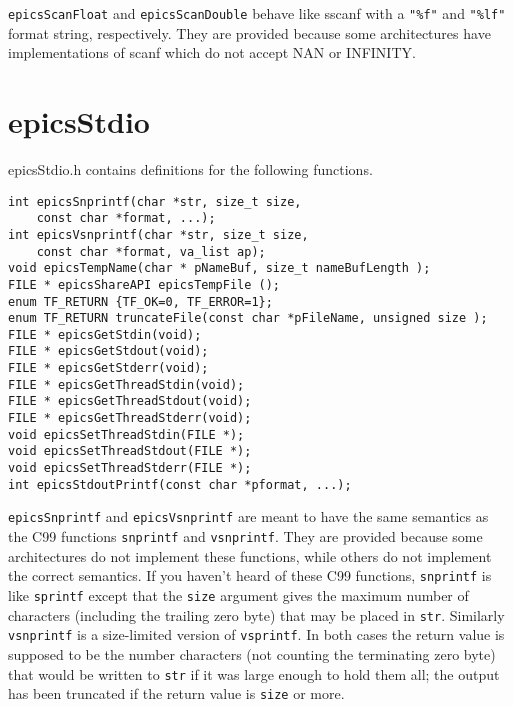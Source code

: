 \verb|epicsScanFloat| and \verb|epicsScanDouble| behave like sscanf with a \verb|"%f"| and \verb|"%lf"| format string, respectively.  
They are provided because some architectures have implementations of scanf which do not accept NAN or INFINITY.



\section{epicsStdio}

epicsStdio.h contains definitions for the following functions.

\begin{verbatim}int epicsSnprintf(char *str, size_t size,
    const char *format, ...);
int epicsVsnprintf(char *str, size_t size,
    const char *format, va_list ap);
void epicsTempName(char * pNameBuf, size_t nameBufLength );
FILE * epicsShareAPI epicsTempFile ();
enum TF_RETURN {TF_OK=0, TF_ERROR=1};
enum TF_RETURN truncateFile(const char *pFileName, unsigned size );
FILE * epicsGetStdin(void);
FILE * epicsGetStdout(void);
FILE * epicsGetStderr(void);
FILE * epicsGetThreadStdin(void);
FILE * epicsGetThreadStdout(void);
FILE * epicsGetThreadStderr(void);
void epicsSetThreadStdin(FILE *);
void epicsSetThreadStdout(FILE *);
void epicsSetThreadStderr(FILE *);
int epicsStdoutPrintf(const char *pformat, ...);
\end{verbatim}
\verb|epicsSnprintf| and \verb|epicsVsnprintf| are meant to have the same semantics as the C99 functions \verb|snprintf| and 
\verb|vsnprintf|. They are provided because some architectures do not implement these functions, while others do not 
implement the correct semantics. If you haven't heard of these C99 functions, \verb|snprintf| is like \verb|sprintf| except that 
the \verb|size| argument gives the maximum number of characters (including the trailing zero byte) that may be placed in \verb|str|. 
Similarly \verb|vsnprintf| is a size-limited version of \verb|vsprintf|. In both cases the return value is supposed to be the 
number characters (not counting the terminating zero byte) that would be written to \verb|str| if it was large enough to hold 
them all; the output has been truncated if the return value is \verb|size| or more.

